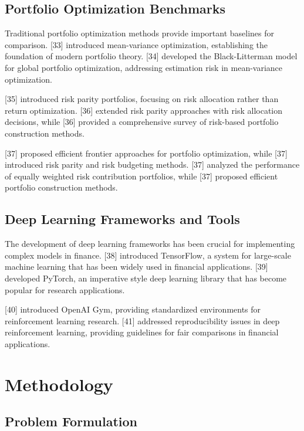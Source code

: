 \documentclass[11pt]{article}
\begin{document}
\subsection{Portfolio Optimization Benchmarks}

Traditional portfolio optimization methods provide important baselines for comparison. [33] introduced mean-variance optimization, establishing the foundation of modern portfolio theory. [34] developed the Black-Litterman model for global portfolio optimization, addressing estimation risk in mean-variance optimization.

[35] introduced risk parity portfolios, focusing on risk allocation rather than return optimization. [36] extended risk parity approaches with risk allocation decisions, while [36] provided a comprehensive survey of risk-based portfolio construction methods.

[37] proposed efficient frontier approaches for portfolio optimization, while [37] introduced risk parity and risk budgeting methods. [37] analyzed the performance of equally weighted risk contribution portfolios, while [37] proposed efficient portfolio construction methods.

\subsection{Deep Learning Frameworks and Tools}

The development of deep learning frameworks has been crucial for implementing complex models in finance. [38] introduced TensorFlow, a system for large-scale machine learning that has been widely used in financial applications. [39] developed PyTorch, an imperative style deep learning library that has become popular for research applications.

[40] introduced OpenAI Gym, providing standardized environments for reinforcement learning research. [41] addressed reproducibility issues in deep reinforcement learning, providing guidelines for fair comparisons in financial applications.

\section{Methodology}

\subsection{Problem Formulation}
\end{document}
